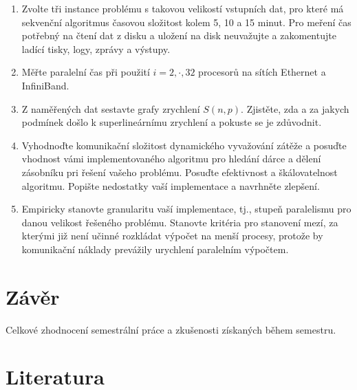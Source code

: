 \documentclass[12pt]{article}
\begin{document}
\begin{enumerate}
\item Zvolte tři instance problému s takovou velikostí vstupních dat, pro které má
sekvenční algoritmus časovou složitost kolem 5, 10 a 15 minut. Pro
meření čas potřebný na čtení dat z disku a uložení na disk
neuvažujte a zakomentujte ladící tisky, logy, zprávy a výstupy.
\item Měřte paralelní čas při použití $i=2,\cdot,32$ procesorů na sítích Ethernet a InfiniBand.
\item Z naměřených dat sestavte grafy zrychlení $S(n,p)$. Zjistěte, zda a za jakych podmínek
došlo k superlineárnímu zrychlení a pokuste se je zdůvodnit.
\item Vyhodnoďte komunikační složitost dynamického vyvažování zátěže a posuďte
vhodnost vámi implementovaného algoritmu pro hledání dárce a dělení
zásobníku pri řešení vašeho problému. Posuďte efektivnost a
škálovatelnost algoritmu. Popište nedostatky vaší implementace a
navrhněte zlepšení.
\item Empiricky stanovte
granularitu vaší implementace, tj., stupeň paralelismu pro danou
velikost řešeného problému. Stanovte kritéria pro stanovení mezí, za
kterými již není učinné rozkládat výpočet na menší procesy, protože
by komunikační náklady prevážily urychlení paralelním výpočtem.

\end{enumerate}

\section{Závěr}

Celkové zhodnocení semestrální práce a zkušenosti získaných během
semestru.

\section{Literatura}
\end{document}
